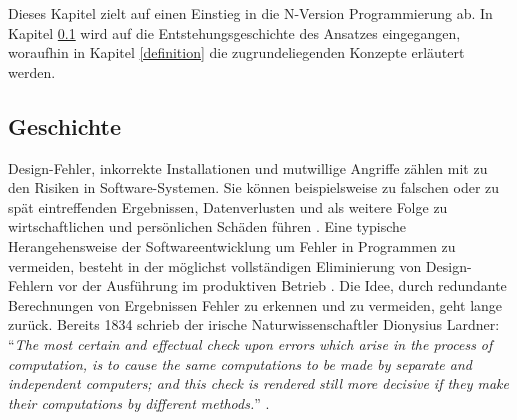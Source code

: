 %
Dieses Kapitel zielt auf einen Einstieg in die N-Version Programmierung ab. In Kapitel \ref{geschichte} wird auf die Entstehungsgeschichte des Ansatzes eingegangen, woraufhin in Kapitel \ref{definition} die zugrundeliegenden Konzepte erläutert werden.
\subsection{Geschichte}\label{geschichte}
%
Design-Fehler, inkorrekte Installationen und mutwillige Angriffe zählen mit zu den Risiken in Software-Systemen. Sie können beispielsweise zu falschen oder zu spät eintreffenden Ergebnissen, Datenverlusten und als weitere Folge zu wirtschaftlichen und persönlichen Schäden führen \cite{Laprie:1995:DCC:1899254.1899261}.
Eine typische Herangehensweise der Softwareentwicklung um Fehler in Programmen zu vermeiden, besteht in der möglichst vollständigen Eliminierung von Design-Fehlern vor der Ausführung im produktiven Betrieb \cite{Avizienis:1975:FFC:800027.808469}. 
Die Idee, durch redundante Berechnungen von Ergebnissen Fehler zu erkennen und zu vermeiden, geht lange zurück. Bereits 1834 schrieb der irische Naturwissenschaftler Dionysius Lardner: \enquote{\emph{The most certain and effectual check upon errors which arise in the process of computation,	is to cause the same computations to be made by separate and independent computers; and this	check is rendered still more decisive if they make their computations by different methods.}} \cite{lardner}.
%


